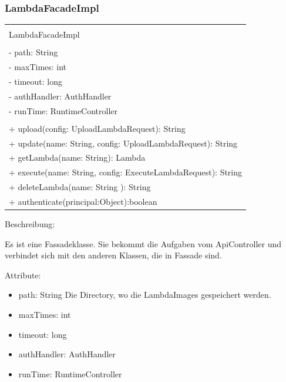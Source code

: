 \documentclass[a4paper,20pt,oneside]{book}
\begin{document}
	\subsubsection{LambdaFacadeImpl}
	\centering
	\begin{tabular}{|l|}
	\hline \\
	LambdaFacadeImpl \\
	\hline \\
	- path: String \\	
	- maxTimes: int \\	
	- timeout: long\\
	- authHandler: AuthHandler \\
	- runTime: RuntimeController \\	
	\hline \\
	+ upload(config: UploadLambdaRequest): String\\
    + update(name: String, config: UploadLambdaRequest): String \\
    + getLambda(name: String): Lambda  \\
    + execute(name: String, config: ExecuteLambdaRequest): String \\
    +  deleteLambda(name: String ): String\\
    + authenticate(principal:Object):boolean\\
	\hline 
	\end{tabular}
	\vspace{0.5cm}
	
	
	\raggedright
	
	Beschreibung:
	
	Es ist eine Fassadeklasse. Sie bekommt die Aufgaben vom ApiController und verbindet sich mit den anderen Klassen, die in Fassade sind. 
	
	\vspace{0.5cm}
	Attribute:
	\begin{itemize}
	\item path: String\linebreak
	Die Directory, wo die LambdaImages gespeichert werden.
	\item maxTimes: int \linebreak
	\item timeout: long\linebreak
	\item authHandler: AuthHandler\linebreak
	\item runTime: RuntimeController\linebreak
	
	
	\end{itemize}
	
\end{document}
